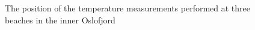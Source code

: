 \documentclass[12pt,a4paper,english]{article}
\begin{document}
\begin{figure}[ht]
{\begin{minipage}[r]{0.4\textwidth}
 \\
 \\
\end{minipage}
}
\caption{\small
The position of the temperature measurements performed at three beaches in the inner Oslofjord}
\label{fig:kart_strand}
\end{figure}
\end{document}
